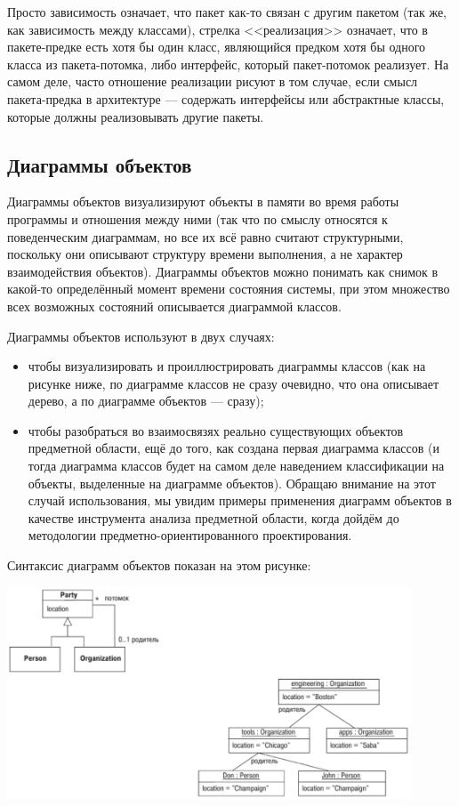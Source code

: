 \documentclass{../../text-style}
\begin{document}
Просто зависимость означает, что пакет как-то связан с другим пакетом (так же, как зависимость между классами), стрелка <<реализация>> означает, что в пакете-предке есть хотя бы один класс, являющийся предком хотя бы одного класса из пакета-потомка, либо интерфейс, который пакет-потомок реализует. На самом деле, часто отношение реализации рисуют в том случае, если смысл пакета-предка в архитектуре --- содержать интерфейсы или абстрактные классы, которые должны реализовывать другие пакеты.

\subsection{Диаграммы объектов}

Диаграммы объектов визуализируют объекты в памяти во время работы программы и отношения между ними (так что по смыслу относятся к поведенческим диаграммам, но все их всё равно считают структурными, поскольку они описывают структуру времени выполнения, а не характер взаимодействия объектов). Диаграммы объектов можно понимать как снимок в какой-то определённый момент времени состояния системы, при этом множество всех возможных состояний описывается диаграммой классов.

Диаграммы объектов используют в двух случаях:

\begin{itemize}
    \item чтобы визуализировать и проиллюстрировать диаграммы классов (как на рисунке ниже, по диаграмме классов не сразу очевидно, что она описывает дерево, а по диаграмме объектов --- сразу);
    \item чтобы разобраться во взаимосвязях реально существующих объектов предметной области, ещё до того, как создана первая диаграмма классов (и тогда диаграмма классов будет на самом деле наведением классификации на объекты, выделенные на диаграмме объектов). Обращаю внимание на этот случай использования, мы увидим примеры применения диаграмм объектов в качестве инструмента анализа предметной области, когда дойдём до методологии предметно-ориентированного проектирования.
\end{itemize}

Синтаксис диаграмм объектов показан на этом рисунке:

\begin{center}
    \includegraphics[width=0.9\textwidth]{objectDiagrams.png}
\end{center}
\end{document}
